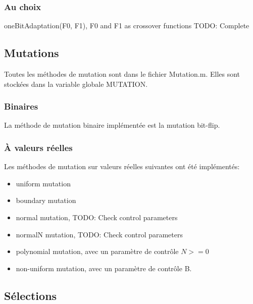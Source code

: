 \documentclass[12pt, letterpaper]{article}
\begin{document}
\subsubsection{Au choix}

oneBitAdaptation(F0, F1), F0 and F1 as crossover functions
TODO: Complete

\subsection{Mutations}

Toutes les méthodes de mutation sont dans le fichier Mutation.m.
Elles sont stockées dans la variable globale MUTATION.

\subsubsection{Binaires}

La méthode de mutation binaire implémentée est la mutation bit-flip.

\subsubsection{À valeurs réelles}

Les méthodes de mutation sur valeurs réelles suivantes ont été implémentés:

\begin{itemize}
\item uniform mutation\\
  
\item boundary mutation\\
  
\item normal mutation, TODO: Check control parameters\\
  
\item normalN mutation, TODO: Check control parameters\\
  
\item polynomial mutation, avec un paramètre de contrôle $N >= 0$\\
  
\item non-uniform mutation, avec un paramètre de contrôle B.\\
\end{itemize}

\subsection{Sélections}
\end{document}
